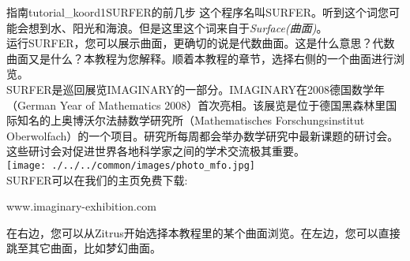 \begin{surferIntroPage}{指南}{tutorial_koord1}{SURFER的前几步}
这个程序名叫SURFER。听到这个词您可能会想到水、阳光和海浪。但是这里这个词来自于\textit{Surface(曲面)}。
\\

运行SURFER，您可以展示曲面，更确切的说是代数曲面。这是什么意思？代数曲面又是什么？本教程为您解释。顺着本教程的章节，选择右侧的一个曲面进行浏览。\\
SURFER是巡回展览IMAGINARY的一部分。IMAGINARY在2008德国数学年（German Year of Mathematics 2008）首次亮相。该展览是位于德国黑森林里国际知名的上奥博沃尔法赫数学研究所（Mathematisches Forschungsinstitut Oberwolfach）的一个项目。研究所每周都会举办数学研究中最新课题的研讨会。这些研讨会对促进世界各地科学家之间的学术交流极其重要。\\
\vspace{0.2cm} \hspace{3.5cm}\texttt{[image: ./../../common/images/photo\_mfo.jpg]}\\
SURFER可以在我们的主页免费下载: \\
\begin{centering}
www.imaginary-exhibition.com\\
\end{centering}
 \vspace{0.2cm}
在右边，您可以从Zitrus开始选择本教程里的某个曲面浏览。在左边，您可以直接跳至其它曲面，比如梦幻曲面。
\end{surferIntroPage}
